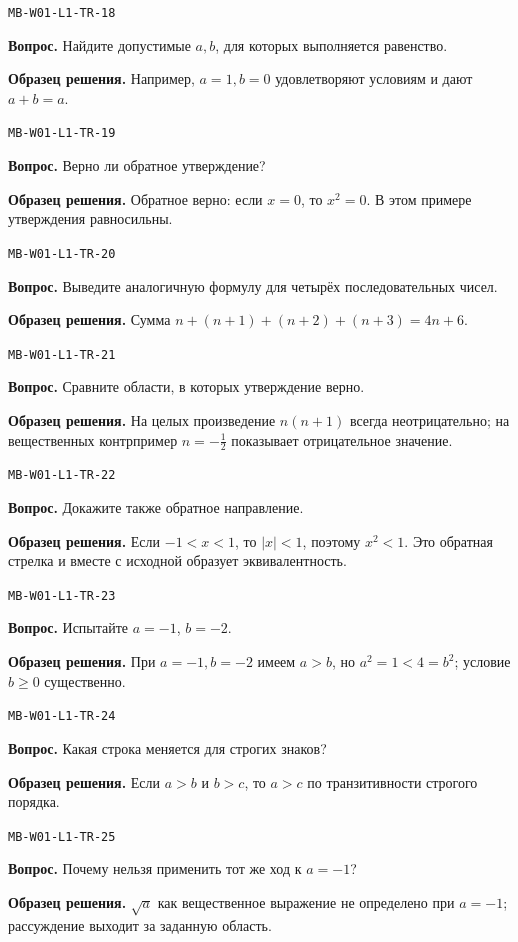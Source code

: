 \documentclass[11pt,a4paper,openany]{book}
\newcommand{\muid}[1]{\texttt{\footnotesize #1}}
\begin{document}
\noindent\muid{MB-W01-L1-TR-18}\par \textbf{Вопрос.} Найдите допустимые $a,b$, для которых выполняется равенство.\par 
\textbf{Образец решения.} Например, $a=1,b=0$ удовлетворяют условиям и дают $a+b=a$.\medskip

\noindent\muid{MB-W01-L1-TR-19}\par \textbf{Вопрос.} Верно ли обратное утверждение?\par 
\textbf{Образец решения.} Обратное верно: если $x=0$, то $x^2=0$. В этом примере утверждения равносильны.\medskip

\noindent\muid{MB-W01-L1-TR-20}\par \textbf{Вопрос.} Выведите аналогичную формулу для четырёх последовательных чисел.\par 
\textbf{Образец решения.} Сумма $n+(n+1)+(n+2)+(n+3)=4n+6$.\medskip

\noindent\muid{MB-W01-L1-TR-21}\par \textbf{Вопрос.} Сравните области, в которых утверждение верно.\par 
\textbf{Образец решения.} На целых произведение $n(n+1)$ всегда неотрицательно; на вещественных контрпример $n=-\tfrac12$ показывает отрицательное значение.\medskip

\noindent\muid{MB-W01-L1-TR-22}\par \textbf{Вопрос.} Докажите также обратное направление.\par 
\textbf{Образец решения.} Если $-1<x<1$, то $|x|<1$, поэтому $x^2<1$. Это обратная стрелка и вместе с исходной образует эквивалентность.\medskip

\noindent\muid{MB-W01-L1-TR-23}\par \textbf{Вопрос.} Испытайте $a=-1$, $b=-2$.\par 
\textbf{Образец решения.} При $a=-1,b=-2$ имеем $a>b$, но $a^2=1<4=b^2$; условие $b\ge0$ существенно.\medskip

\noindent\muid{MB-W01-L1-TR-24}\par \textbf{Вопрос.} Какая строка меняется для строгих знаков?\par 
\textbf{Образец решения.} Если $a>b$ и $b>c$, то $a>c$ по транзитивности строгого порядка.\medskip

\noindent\muid{MB-W01-L1-TR-25}\par \textbf{Вопрос.} Почему нельзя применить тот же ход к $a=-1$?\par 
\textbf{Образец решения.} $\sqrt a$ как вещественное выражение не определено при $a=-1$; рассуждение выходит за заданную область.\medskip
\end{document}
